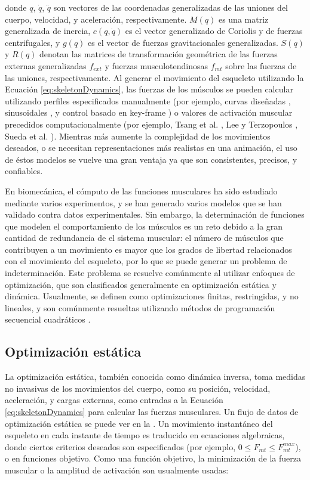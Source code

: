 donde $q$, $\dot{q}$, $\ddot{q}$ son vectores de las coordenadas generalizadas de las uniones del cuerpo, velocidad, y aceleración, respectivamente. $M(q)$ es una matriz generalizada de inercia, $c(q,\dot{q})$ es el vector generalizado de Coriolis y de fuerzas centrifugales, y $g(q)$ es el vector de fuerzas gravitacionales generalizadas. $S(q)$ y $R(q)$ denotan las matrices de transformación geométrica de las fuerzas externas generalizadas $f_{ext}$ y fuerzas musculotendinosas $f_{mt}$ sobre las fuerzas de las uniones, respectivamente. Al generar el movimiento del esqueleto utilizando la Ecuación \ref{eq:skeletonDynamics}, las fuerzas de los músculos se pueden calcular utilizando perfiles especificados manualmente (por ejemplo, curvas diseñadas \citep{chen1992pump}, sinusoidales \citep{tu1994artificial, zordan2004breathe}, y control basado en key-frame \citep{teran2003finite}) o valores de activación muscular precedidos computacionalmente (por ejemplo, Tsang et al. \citep{tsang2005helping}, Lee y Terzopoulos \citep{lee2006heads}, Sueda et al. \citep{sueda2008musculotendon}). Mientras más aumente la complejidad de los movimientos deseados, o se necesitan representaciones más realistas en una animación, el uso de éstos modelos se vuelve una gran ventaja ya que son consistentes, precisos, y confiables.

En biomecánica, el cómputo de las funciones musculares ha sido estudiado mediante varios experimentos, y se han generado varios modelos que se han validado contra datos experimentales. Sin embargo, la determinación de funciones que modelen el comportamiento de los músculos es un reto debido a la gran cantidad de redundancia de el sistema muscular: el número de músculos que contribuyen a un movimiento es mayor que los grados de libertad relacionados con el movimiento del esqueleto, por lo que se puede generar un problema de indeterminación. Este problema se resuelve comúnmente al utilizar enfoques de optimización, que son clasificados generalmente en optimización estática y dinámica. Usualmente, se definen como optimizaciones finitas, restringidas, y no lineales, y son comúnmente resueltas utilizando métodos de programación secuencial cuadráticos \citep{nocedal2006numerical}.

\subsection{Optimización estática}

La optimización estática, también conocida como dinámica inversa, toma medidas no invasivas de los movimientos del cuerpo, como su posición, velocidad, aceleración, y cargas externas, como entradas a la Ecuación  \ref{eq:skeletonDynamics} para calcular las fuerzas musculares. Un flujo de datos de optimización estática se puede ver en la . Un movimiento instantáneo del esqueleto en cada instante de tiempo es traducido en ecuaciones algebraicas, donde ciertos criterios deseados son especificados (por ejemplo, $0 \leq F_{mt}\leq F_{mt}^{max}$), o en funciones objetivo. Como una función objetivo, la minimización de la fuerza muscular o la amplitud de activación son usualmente usadas:

